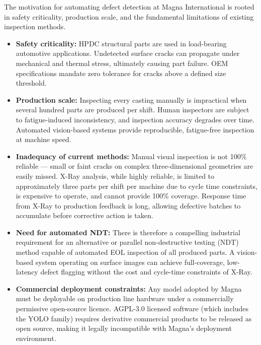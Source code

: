 The motivation for automating defect detection at Magna International is rooted in safety criticality, production scale, and the fundamental limitations of existing inspection methods.

\begin{itemize}[leftmargin=2em]
    \item \textbf{Safety criticality:} HPDC structural parts are used in load-bearing automotive applications. Undetected surface cracks can propagate under mechanical and thermal stress, ultimately causing part failure. OEM specifications mandate zero tolerance for cracks above a defined size threshold.

    \item \textbf{Production scale:} Inspecting every casting manually is impractical when several hundred parts are produced per shift. Human inspectors are subject to fatigue-induced inconsistency, and inspection accuracy degrades over time. Automated vision-based systems provide reproducible, fatigue-free inspection at machine speed.

    \item \textbf{Inadequacy of current methods:} Manual visual inspection is not 100\% reliable --- small or faint cracks on complex three-dimensional geometries are easily missed. X-Ray analysis, while highly reliable, is limited to approximately three parts per shift per machine due to cycle time constraints, is expensive to operate, and cannot provide 100\% coverage. Response time from X-Ray to production feedback is long, allowing defective batches to accumulate before corrective action is taken.

    \item \textbf{Need for automated NDT:} There is therefore a compelling industrial requirement for an alternative or parallel non-destructive testing (NDT) method capable of automated EOL inspection of all produced parts. A vision-based system operating on surface images can achieve full-coverage, low-latency defect flagging without the cost and cycle-time constraints of X-Ray.

    \item \textbf{Commercial deployment constraints:} Any model adopted by Magna must be deployable on production line hardware under a commercially permissive open-source licence. AGPL-3.0 licensed software (which includes the YOLO family) requires derivative commercial products to be released as open source, making it legally incompatible with Magna's deployment environment.
\end{itemize}

